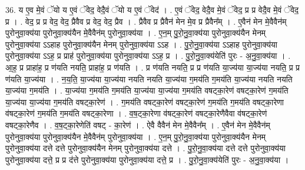 \documentclass[17pt]{extarticle}
\begin{document}
36. य ए॒व मे॒वं ॅयो य ए॒वं ॅवेद॒ वेदै॒वं ॅयो य ए॒वं ॅवेद॑ । . ए॒वं ॅवेद॒ वेदै॒व मे॒वं ॅवेद॒ प्र प्र वेदै॒व मे॒वं ॅवेद॒ प्र । . वेद॒ प्र प्र वेद॒ वेद॒ प्रैवैव प्र वेद॒ वेद॒ प्रैव । . प्रैवैव प्र प्रैवैन॑ मेन मे॒व प्र प्रैवैन᳚म् । . ए॒वैन॑ मेन मे॒वैवैन॑म् पुरोनुवा॒क्य॑या पुरोनुवा॒क्य॑यैन मे॒वैवैन॑म् पुरोनुवा॒क्य॑या । . ए॒न॒म् पु॒रो॒नु॒वा॒क्य॑या पुरोनुवा॒क्य॑यैन मेनम् पुरोनुवा॒क्य॑या ऽऽहाह पुरोनुवा॒क्य॑यैन मेनम् पुरोनुवा॒क्य॑या ऽऽह । . पु॒रो॒नु॒वा॒क्य॑या ऽऽहाह पुरोनुवा॒क्य॑या पुरोनुवा॒क्य॑या ऽऽह॒ प्र प्राह॑ पुरोनुवा॒क्य॑या पुरोनुवा॒क्य॑या ऽऽह॒ प्र । . पु॒रो॒नु॒वा॒क्य॑येति॑ पुरः - अ॒नु॒वा॒क्य॑या । . आ॒ह॒ प्र प्राहा॑ह॒ प्र ण॑यति नयति॒ प्राहा॑ह॒ प्र ण॑यति । . प्र ण॑यति नयति॒ प्र प्र ण॑यति या॒ज्य॑या या॒ज्य॑या नयति॒ प्र प्र ण॑यति या॒ज्य॑या । . न॒य॒ति॒ या॒ज्य॑या या॒ज्य॑या नयति नयति या॒ज्य॑या ग॒मय॑ति ग॒मय॑ति या॒ज्य॑या नयति नयति या॒ज्य॑या ग॒मय॑ति । . या॒ज्य॑या ग॒मय॑ति ग॒मय॑ति या॒ज्य॑या या॒ज्य॑या ग॒मय॑ति वषट्का॒रेण॑ वषट्का॒रेण॑ ग॒मय॑ति या॒ज्य॑या या॒ज्य॑या ग॒मय॑ति वषट्का॒रेण॑ । . ग॒मय॑ति वषट्का॒रेण॑ वषट्का॒रेण॑ ग॒मय॑ति ग॒मय॑ति वषट्का॒रेणा व॑षट्का॒रेण॑ ग॒मय॑ति ग॒मय॑ति वषट्का॒रेणा । . व॒ष॒ट्का॒रेणा व॑षट्का॒रेण॑ वषट्का॒रेणैवैवा व॑षट्का॒रेण॑ वषट्का॒रेणैव । . व॒ष॒ट्का॒रेणेति॑ वषट् - का॒रेण॑ । . ऐवै वैवैन॑ मेन मे॒वैवैन᳚म् । . ए॒वैन॑ मेन मे॒वैवैन॑म् पुरोनुवा॒क्य॑या पुरोनुवा॒क्य॑यैन मे॒वैवैन॑म् पुरोनुवा॒क्य॑या । . ए॒न॒म् पु॒रो॒नु॒वा॒क्य॑या पुरोनुवा॒क्य॑यैन मेनम् पुरोनुवा॒क्य॑या दत्ते दत्ते पुरोनुवा॒क्य॑यैन मेनम् पुरोनुवा॒क्य॑या दत्ते । . पु॒रो॒नु॒वा॒क्य॑या दत्ते दत्ते पुरोनुवा॒क्य॑या पुरोनुवा॒क्य॑या दत्ते॒ प्र प्र द॑त्ते पुरोनुवा॒क्य॑या पुरोनुवा॒क्य॑या दत्ते॒ प्र । . पु॒रो॒नु॒वा॒क्य॑येति॑ पुरः - अ॒नु॒वा॒क्य॑या । \newline
\end{document}
